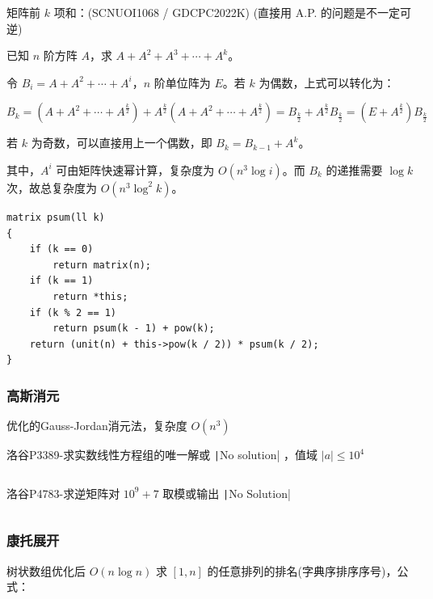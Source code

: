 \documentclass[twocolumn,10pt]{ctexart}
\begin{document}
\begin{notebox}
矩阵前 $k$ 项和：(SCNUOI1068 / GDCPC2022K) (直接用 A.P. 的问题是不一定可逆)
\end{notebox}

已知 $n$ 阶方阵 $A$，求 $A+A^2+A^3+\cdots+A^k$。

令 $B_i=A+A^2+\cdots+A^i$，$n$ 阶单位阵为 $E$。若 $k$ 为偶数，上式可以转化为：

\begin{adjustbox}{max width=\linewidth,center}
$B_k=(A+A^2+\cdots+A^{\frac k2})+A^{\frac k2}(A+A^2+\cdots+A^{\frac k2})=B_{\frac k2}+A^{\frac k2}B_{\frac k2}=(E+A^{\frac k2})B_{\frac k2}$
\end{adjustbox}

若 $k$ 为奇数，可以直接用上一个偶数，即 $B_k=B_{k-1}+A^k$。

其中，$A^i$ 可由矩阵快速幂计算，复杂度为 $O(n^3\log i)$。而 $B_k$ 的递推需要 $\log k$ 次，故总复杂度为 $O(n^3\log^2k)$。

\begin{verbatim}
matrix psum(ll k)
{
    if (k == 0)
        return matrix(n);
    if (k == 1)
        return *this;
    if (k % 2 == 1)
        return psum(k - 1) + pow(k);
    return (unit(n) + this->pow(k / 2)) * psum(k / 2);
}
\end{verbatim}

\subsubsection{高斯消元}

优化的Gauss-Jordan消元法，复杂度 $O(n^3)$

\begin{notebox}
洛谷P3389-求实数线性方程组的唯一解或 \texttt|No solution| ，值域 $|a|\le10^4$
\end{notebox}

\inputminted{cpp}{code/p3389_gauss.cpp}

\begin{notebox}
洛谷P4783-求逆矩阵对 $10^9+7$ 取模或输出 \texttt|No Solution|
\end{notebox}

\inputminted{cpp}{code/p4783_gauss.cpp}

\subsubsection{康托展开}

树状数组优化后 $O(n\log n)$ 求 $[1,n]$ 的任意排列的排名(字典序排序序号)，公式：
\end{document}
